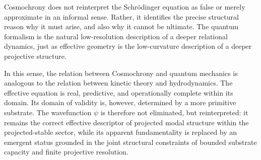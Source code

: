Cosmochrony does not reinterpret the Schr\"{o}dinger equation as false or merely
approximate in an informal sense.
Rather, it identifies the precise structural reason why it must arise, and also why it cannot
be ultimate.
The quantum formalism is the natural low-resolution description of a deeper relational
dynamics, just as effective geometry is the low-curvature description of a deeper projective
structure.

In this sense, the relation between Cosmochrony and quantum mechanics is analogous to
the relation between kinetic theory and hydrodynamics.
The effective equation is real, predictive, and operationally complete within its domain.
Its domain of validity is, however, determined by a more primitive substrate.
The wavefunction $\psi$ is therefore not eliminated, but reinterpreted:
it remains the correct effective descriptor of projected modal structure within the
projected-stable sector, while its apparent fundamentality is replaced by an emergent
status grounded in the joint structural constraints of bounded substrate capacity and
finite projective resolution.
